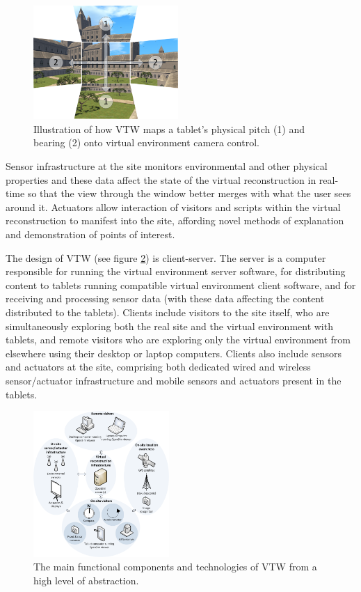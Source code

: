 \documentclass[conference,a4paper]{IEEEtran}
\begin{document}
\begin{figure}[!t]
\centering
\includegraphics[width=0.49\textwidth]{tiltdiagramwarrows.png}
\caption{Illustration of how VTW maps a tablet's physical pitch (1) and bearing (2) onto virtual environment camera control.}
\label{tiltdiagram}
\end{figure}

Sensor infrastructure at the site monitors environmental and other physical properties and these data affect the state of the virtual reconstruction in real-time so that the view through the window better merges with what the user sees around it. Actuators allow interaction of visitors and scripts within the virtual reconstruction to manifest into the site, affording novel methods of explanation and demonstration of points of interest.

The design of VTW (see figure \ref{visio_diagram_2_tech}) is client-server. The server is a computer responsible for running the virtual environment server software, for distributing content to tablets running compatible virtual environment client software, and for receiving and processing sensor data (with these data affecting the content distributed to the tablets). Clients include visitors to the site itself, who are simultaneously exploring both the real site and the virtual environment with tablets, and remote visitors who are exploring only the virtual environment from elsewhere using their desktop or laptop computers. Clients also include sensors and actuators at the site, comprising both dedicated wired and wireless sensor/actuator infrastructure and mobile sensors and actuators present in the tablets.

\begin{figure}[!t]
\centering
\includegraphics[width=0.46\textwidth]{visio_diagram_2_tech.png}
\caption{The main functional components and technologies of VTW from a high level of abstraction.}
\label{visio_diagram_2_tech}
\end{figure}
\end{document}
